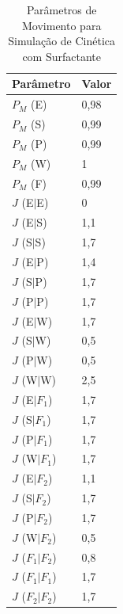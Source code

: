 \documentclass[12pt,oneside]{report}
\begin{document}
\begin{table}[H]
    \centering
    \caption{Parâmetros de Movimento para Simulação de Cinética com Surfactante}
    \vspace{0.2cm}
    \begin{tabularx}{\textwidth}{X m{5cm}}
        \hline
        \textbf{Parâmetro} & \textbf{Valor} \\
        \hline
        $P_M$ (E)          & 0{,}98         \\
        $P_M$ (S)          & 0{,}99         \\
        $P_M$ (P)          & 0{,}99         \\
        $P_M$ (W)          & 1              \\
        $P_M$ (F)          & 0{,}99         \\
        $J$ (E$|$E)        & 0              \\
        $J$ (E$|$S)        & 1{,}1          \\
        $J$ (S$|$S)        & 1{,}7          \\
        $J$ (E$|$P)        & 1{,}4          \\
        $J$ (S$|$P)        & 1{,}7          \\
        $J$ (P$|$P)        & 1{,}7          \\
        $J$ (E$|$W)        & 1{,}7          \\
        $J$ (S$|$W)        & 0{,}5          \\
        $J$ (P$|$W)        & 0{,}5          \\
        $J$ (W$|$W)        & 2{,}5          \\
        $J$ (E$|F_1$)      & 1{,}7          \\
        $J$ (S$|F_1$)      & 1{,}7          \\
        $J$ (P$|F_1$)      & 1{,}7          \\
        $J$ (W$|F_1$)      & 1{,}7          \\
        $J$ (E$|F_2$)      & 1{,}1          \\
        $J$ (S$|F_2$)      & 1{,}7          \\
        $J$ (P$|F_2$)      & 1{,}7          \\
        $J$ (W$|F_2$)      & 0{,}5          \\
        $J$ ($F_1|F_2$)    & 0{,}8          \\
        $J$ ($F_1|F_1$)    & 1{,}7          \\
        $J$ ($F_2|F_2$)    & 1{,}7          \\
        \hline
    \end{tabularx}
    \vspace{0.2cm}
    \label{tab:params_movimento_surfactante}
\end{table}
\end{document}
